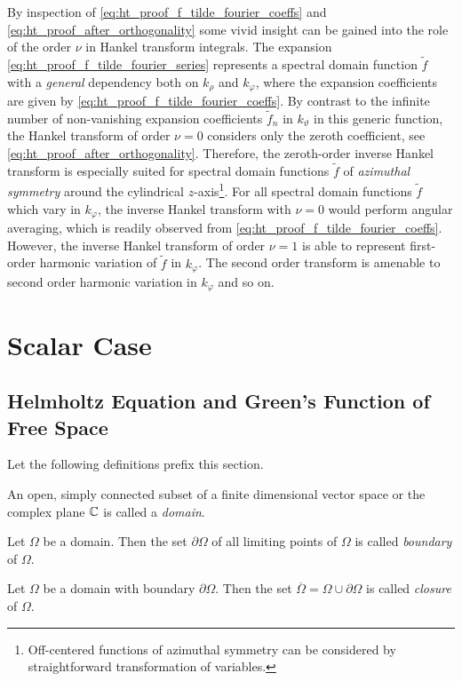 By inspection of \eqref{eq:ht_proof_f_tilde_fourier_coeffs} and
\eqref{eq:ht_proof_after_orthogonality} some vivid insight can be gained
into the role of the order $\nu$ in Hankel transform integrals. 
The expansion \eqref{eq:ht_proof_f_tilde_fourier_series} represents a
spectral domain function $\tilde{f}$ with a \emph{general} dependency both on
$k_\rho$ and $k_\varphi$, where the expansion coefficients are given by
\eqref{eq:ht_proof_f_tilde_fourier_coeffs}.
By contrast to the infinite number of non-vanishing expansion coefficients
$\tilde{f}_n$ in $k_\vartheta$ in this generic function, the Hankel transform
of order $\nu = 0$ considers only the zeroth coefficient,
see \eqref{eq:ht_proof_after_orthogonality}.
Therefore, the zeroth-order inverse Hankel transform is especially suited for
spectral domain functions $\tilde{f}$ of \emph{azimuthal symmetry} around the
cylindrical $z$-axis\footnote{Off-centered functions of azimuthal
symmetry can be considered by straightforward transformation of variables.}.
For all spectral domain functions $\tilde{f}$ which vary in $k_\varphi$, the
inverse Hankel transform with $\nu = 0$ would perform angular averaging, which
is readily observed from \eqref{eq:ht_proof_f_tilde_fourier_coeffs}.
However, the inverse Hankel transform of order $\nu = 1$ is able to represent
first-order harmonic variation of $\tilde{f}$ in $k_\varphi$.
The second order transform is amenable to second order harmonic variation in
$k_\varphi$ and so on.








\chapter{Scalar Case}
\label{ch:scalar_case}







\section{Helmholtz Equation and Green's Function of Free Space}
\label{sec:helmholtz_eq_and_gf}

Let the following definitions prefix this section.
\begin{definition}[Domain]
	An open, simply connected subset of a finite dimensional vector space or
	the complex plane $\mathbb{C}$ is
	called a \emph{domain}.
\end{definition}
\begin{definition}[Boundary]
	Let $\Omega$ be a domain.
	Then the set $\partial\Omega$ of all limiting points of $\Omega$ is called
	\emph{boundary} of $\Omega$.
\end{definition}
\begin{definition}[Closure]
	Let $\Omega$ be a domain with boundary $\partial\Omega$.
	Then the set $\overline{\Omega} = \Omega \cup \partial\Omega$
	is called \emph{closure} of $\Omega$.
\end{definition}


